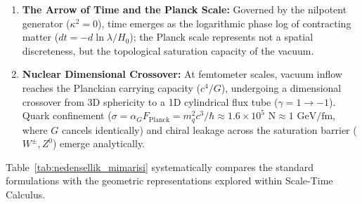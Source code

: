 \begin{enumerate}
    \item \textbf{The Arrow of Time and the Planck Scale:} Governed by the nilpotent generator ($\kappa^2=0$), time emerges as the logarithmic phase log of contracting matter ($dt = -d\ln\lambda/H_0$); the Planck scale represents not a spatial discreteness, but the topological saturation capacity of the vacuum.
    \item \textbf{Nuclear Dimensional Crossover:} At femtometer scales, vacuum inflow reaches the Planckian carrying capacity ($c^4/G$), undergoing a dimensional crossover from 3D sphericity to a 1D cylindrical flux tube ($\gamma = 1 \to -1$). Quark confinement ($\sigma = \alpha_G F_{\mathrm{Planck}} = m_q^2 c^3/\hbar \approx 1.6 \times 10^5\text{ N} \approx 1\text{ GeV/fm}$, where $G$ cancels identically) and chiral leakage across the saturation barrier ($W^\pm, Z^0$) emerge analytically.
\end{enumerate}

Table~\ref{tab:nedensellik_mimarisi} systematically compares the standard formulations with the geometric representations explored within Scale-Time Calculus.

